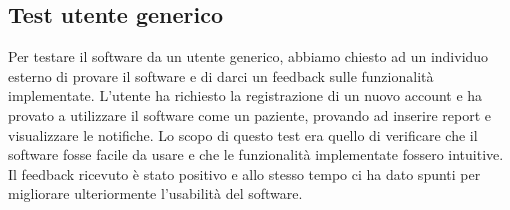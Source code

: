 \documentclass[a4paper]{article}
\begin{document}
\subsection{Test utente generico}

Per testare il software da un utente generico, abbiamo chiesto ad un individuo esterno di provare 
il software e di darci un feedback sulle funzionalità implementate.
L'utente ha richiesto la registrazione di un nuovo account e ha provato a utilizzare il software come un paziente,
provando ad inserire report e visualizzare le notifiche.
Lo scopo di questo test era quello di verificare che il software fosse facile da usare e che 
le funzionalità implementate fossero intuitive.
Il feedback ricevuto è stato positivo e allo stesso tempo ci ha dato spunti
per migliorare ulteriormente l'usabilità del software. 
\end{document}
